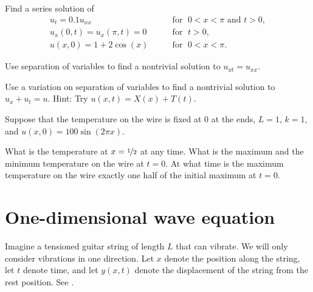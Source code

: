 \begin{exercise}
Find a series solution of
\begin{equation*}
\begin{array}{ll}
u_t =  0.1 u_{xx} & \qquad \text{for } \; 0 < x < \pi \text{ and } t > 0, \\
u_x(0,t) = u_x(\pi,t) = 0 &  \qquad \text{for } \; t > 0, \\
u(x,0) = 1 + 2\cos (x) & \qquad \text{for } \; 0 < x < \pi .
\end{array}
\end{equation*}
\end{exercise}

\begin{exercise}
Use separation of variables to find a nontrivial solution to
$u_{xt} = u_{xx}$.
\end{exercise}

\begin{exercise}
Use a variation on separation of variables 
to find a nontrivial solution to
$u_{x} + u_{t} = u$.  Hint: Try $u(x,t) = X(x)+T(t)$.
\end{exercise}

\begin{exercise}
Suppose that the temperature on the wire is fixed at $0$
at the ends, $L=1$, $k=1$, and $u(x,0) = 100\sin(2 \pi x)$.
\begin{tasks}
\task
What is the temperature at $x = \nicefrac{1}{2}$ at any time.
\task
What is the maximum and the minimum temperature on the wire
at $t=0$.
\task
At what time is the maximum temperature on the wire exactly
one half of the initial maximum at $t=0$.
\end{tasks}
\end{exercise}


\sectionnewpage
\section{One-dimensional wave equation} \label{we:section}


Imagine a tensioned guitar string of length $L$ that can vibrate.
We will only consider vibrations in one direction.  Let
$x$ denote the position along the string, let $t$ denote time,
and let $y(x,t)$
denote the displacement of the string from the rest position.
See
.

